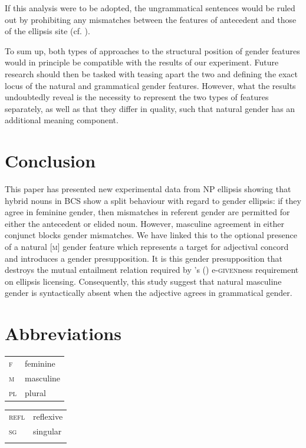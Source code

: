 \documentclass[output=paper,
modfonts,
newtxmath,
hidelinks
]{langscibook}
\begin{document}
\noindent If this analysis were to be adopted, the ungrammatical sentences would be ruled out by prohibiting  any mismatches between the features of antecedent and those of the ellipsis site (cf. \citealt{merchant13}). 
			
			To sum up, both types of approaches to the structural position of gender features would in principle be compatible with the results of our experiment. Future research should then be tasked with teasing apart the two and defining the exact locus of the natural and grammatical gender features. However, what the results undoubtedly reveal is the necessity to represent the two types of features separately, as well as that they differ in quality, such that natural gender has an additional meaning component.   
			
			
			\section{Conclusion}	
			
			This paper has presented new experimental data from  NP ellipsis showing that hybrid nouns in BCS show a split behaviour with regard to gender ellipsis: if they agree in feminine gender, then mismatches in referent gender are permitted for either the antecedent or elided noun. However, masculine agreement in either conjunct blocks gender mismatches. We have linked this to the optional presence of a natural [\textsc{m}] gender feature which represents a target for adjectival concord and introduces a gender presupposition.
			It is this gender presupposition that destroys the mutual entailment relation required by \citeauthor{merchant2001}'s (\citeyear{merchant2001}) e-\textsc{given}ness requirement on ellipsis licensing.
			Consequently,  this study suggest that natural masculine gender is syntactically absent when the adjective agrees in grammatical gender.
		
		
    
    
\section*{Abbreviations}

\begin{tabularx}{.5\textwidth}{@{}lQ@{}}
\textsc{f}&feminine\\
\textsc{m}&masculine\\
\textsc{pl}&plural\\
\end{tabularx}%
\begin{tabularx}{.5\textwidth}{@{}lQ@{}}
\textsc{refl}&reflexive\\
\textsc{sg}&singular\\
&\\
\end{tabularx}
\end{document}
